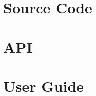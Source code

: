 \documentclass[12pt]{article}
\begin{document}
\begin{appendices}


\section{Source Code}


\newpage

\section{API}


\newpage

\section{User Guide}

\end{appendices}


\newpage
\printindex
\end{document}
